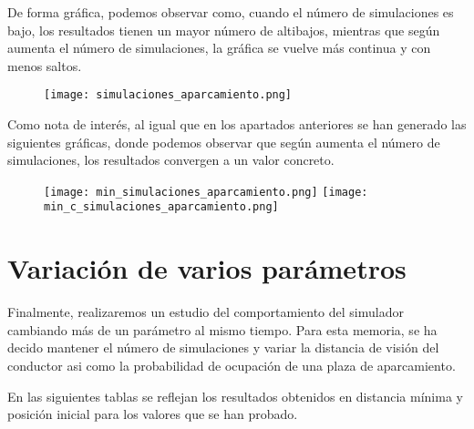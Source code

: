 De forma gráfica, podemos observar como, cuando el número de simulaciones es bajo, los resultados tienen un mayor número de altibajos, mientras que según aumenta el número de simulaciones, la gráfica se vuelve más continua y con menos saltos.

\begin{figure}[h]
\texttt{[image: simulaciones\_aparcamiento.png]}
\centering
\end{figure}

\newpage

Como nota de interés, al igual que en los apartados anteriores se han generado las siguientes gráficas, donde podemos observar que según aumenta el número de simulaciones, los resultados convergen a un valor concreto.

\begin{figure}[h]
\texttt{[image: min\_simulaciones\_aparcamiento.png]}
\texttt{[image: min\_c\_simulaciones\_aparcamiento.png]}
\centering
\end{figure}

\newpage

\section{Variación de varios parámetros}

Finalmente, realizaremos un estudio del comportamiento del simulador cambiando más de un parámetro al mismo tiempo. Para esta memoria, se ha decido mantener el número de simulaciones y variar la distancia de visión del conductor asi como la probabilidad de ocupación de una plaza de aparcamiento.

En las siguientes tablas se reflejan los resultados obtenidos en distancia mínima y posición inicial para los valores que se han probado.


